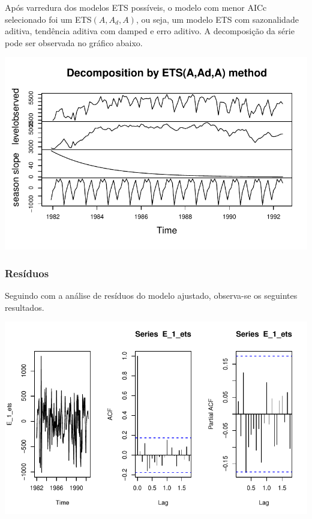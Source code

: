 \documentclass[
  letterpaper,
  DIV=11,
  numbers=noendperiod]{scrartcl}
\begin{document}
Após varredura dos modelos ETS possíveis, o modelo com menor AICc
selecionado foi um ETS\((A, A_{d}, A)\), ou seja, um modelo ETS com
sazonalidade aditiva, tendência aditiva com damped e erro aditivo. A
decomposição da série pode ser observada no gráfico abaixo.

\includegraphics{T2_grupo10_files/figure-pdf/melhor-fit-ETL-sem-transf-1.pdf}

\hypertarget{resuxedduos}{%
\subsubsection{Resíduos}\label{resuxedduos}}

Seguindo com a análise de resíduos do modelo ajustado, observa-se os
seguintes resultados.

\includegraphics{T2_grupo10_files/figure-pdf/residuos-ets-sem-transform-1.pdf}
\end{document}
